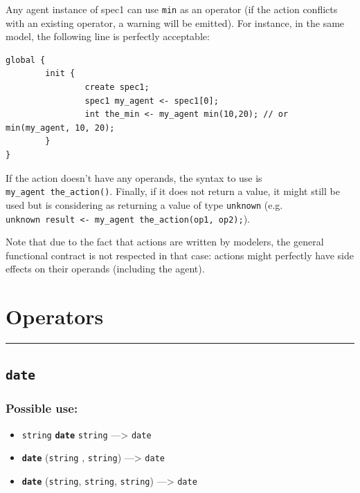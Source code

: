 \documentclass[]{book}
\providecommand{\tightlist}{%
  \setlength{\itemsep}{0pt}\setlength{\parskip}{0pt}}
\theoremstyle{definition}
\theoremstyle{definition}
\theoremstyle{definition}
\theoremstyle{remark}
\begin{document}
Any agent instance of spec1 can use \texttt{min} as an operator (if the
action conflicts with an existing operator, a warning will be emitted).
For instance, in the same model, the following line is perfectly
acceptable:

\begin{verbatim}
global {
        init {
                create spec1;
                spec1 my_agent <- spec1[0];
                int the_min <- my_agent min(10,20); // or min(my_agent, 10, 20);
        }
}
\end{verbatim}

If the action doesn't have any operands, the syntax to use is
\texttt{my\_agent\ the\_action()}. Finally, if it does not return a
value, it might still be used but is considering as returning a value of
type \texttt{unknown} (e.g.
\texttt{unknown\ result\ \textless{}-\ my\_agent\ the\_action(op1,\ op2);}).

Note that due to the fact that actions are written by modelers, the
general functional contract is not respected in that case: actions might
perfectly have side effects on their operands (including the agent).

\section{Operators}\label{operators-2}

\begin{center}\rule{0.5\linewidth}{\linethickness}\end{center}

\subsection{\texorpdfstring{\texttt{date}}{date}}\label{date}

\subsubsection{Possible use:}\label{possible-use-124}

\begin{itemize}
\tightlist
\item
  \texttt{string} \textbf{\texttt{date}} \texttt{string}
  ---\textgreater{} \texttt{date}
\item
  \textbf{\texttt{date}} (\texttt{string} , \texttt{string})
  ---\textgreater{} \texttt{date}
\item
  \textbf{\texttt{date}} (\texttt{string}, \texttt{string},
  \texttt{string}) ---\textgreater{} \texttt{date}
\end{itemize}
\end{document}
